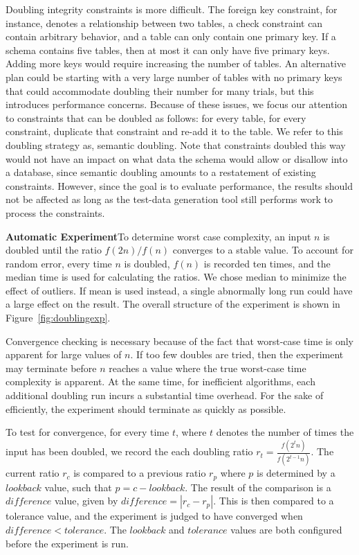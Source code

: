   Doubling integrity constraints is more difficult.  The foreign key constraint, for instance, denotes a relationship
  between two tables, a check constraint can contain arbitrary behavior, and a table can only contain one primary key.
  If a schema contains five tables, then at most it can only have five primary keys.  Adding more keys would require
  increasing the number of tables.  An alternative plan could be starting with a very large number of tables with no
  primary keys that could accommodate doubling their number for many trials, but this introduces performance concerns.
  Because of these issues, we focus our attention to constraints that can be doubled as follows: for every table, for
  every constraint, duplicate that constraint and re-add it to the table.  We refer to this doubling strategy as,
  semantic doubling.  Note that constraints doubled this way would not have an impact on what data the schema would
  allow or disallow into a database, since semantic doubling amounts to a restatement of existing constraints.  However,
  since the goal is to evaluate performance, the results should not be affected as long as the test-data generation tool
  still performs work to process the constraints.


  \textbf{Automatic Experiment}To determine worst case complexity, an input
  $n$ is doubled until the ratio $f(2n) / f(n)$ converges to a stable value.
  To account for random error, every time $n$ is doubled, $f(n)$ is recorded
  ten times, and the median time is used for calculating the ratios.  We chose
  median to minimize the effect of outliers. If mean is used instead, a
  single abnormally long run could have a large effect on the result. The
  overall structure of the experiment is shown in Figure~\ref{fig:doublingexp}.

  Convergence checking is necessary because of the fact that worst-case
  time is only apparent for large values of $n$. If too few doubles
  are tried, then the experiment may terminate before $n$ reaches a value
  where the true worst-case time complexity is apparent. At the same time,
  for inefficient  algorithms, each additional doubling run incurs a substantial
  time overhead. For the sake of efficiently, the experiment should
  terminate as quickly as possible.

  To test for convergence, for every time $t$, where $t$ denotes the
  number of times the input has been doubled, we record the each
  doubling ratio $r_t = \frac{f(2^t n)}{f(2^{t-1}n)}$. The current ratio
  $r_c$ is compared to a previous ratio $r_p$ where $p$ is determined by
  a $\mathit{lookback}$ value, such that $p=c-\mathit{lookback}$.  The
  result of the comparison is a $\mathit{difference}$ value, given by
  $\mathit{difference} = |r_c - r_p|$.  This is then compared to a
  tolerance value, and the experiment is judged to have converged when
  $\mathit{difference}<\mathit{tolerance}$.  The $\mathit{lookback}$ and
  $\mathit{tolerance}$ values are both configured before the experiment is
  run.

